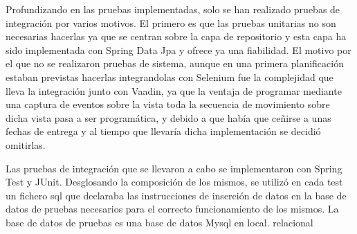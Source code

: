 	
	Profundizando en las pruebas implementadas, solo se han realizado pruebas de integración por varios motivos. El primero es que las pruebas unitarias no son necesarias hacerlas ya que se centran sobre la capa de repositorio y esta capa ha sido implementada con Spring Data Jpa\cite{jpa} y ofrece ya una fiabilidad. El motivo por el que no se realizaron pruebas de sistema, aunque en una primera planificación estaban previstas hacerlas integrandolas con Selenium\cite{selenium} fue la complejidad que lleva la integración junto con Vaadin\cite{vaadin}, ya que la ventaja de programar mediante una captura de eventos sobre la vista toda la secuencia de movimiento sobre dicha vista pasa a ser programática, y debido a que había que ceñirse a unas fechas de entrega y al tiempo que llevaría dicha implementación se decidió omitirlas.

	
	Las pruebas de integración que se llevaron a cabo se implementaron con Spring Test\cite{springTest} y JUnit\cite{junit}. Desglosando la composición de los mismos, se utilizó en cada test un fichero sql que declaraba las instrucciones de inserción de datos en la base de datos de pruebas necesarios para el correcto funcionamiento de los mismos. La base de datos de pruebas es una base de datos Mysql en local. relacional





	 